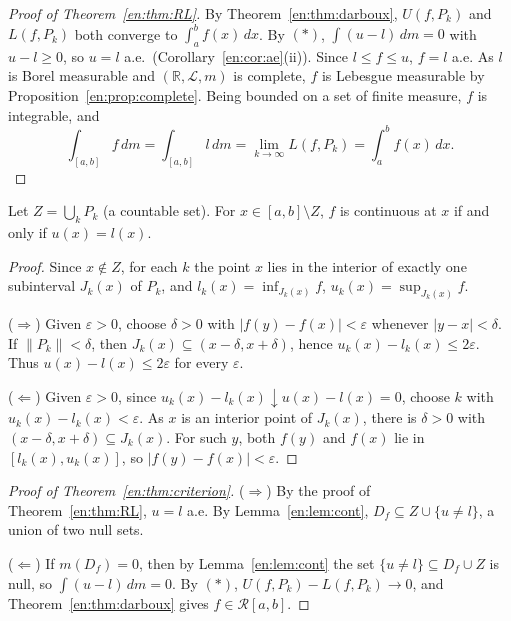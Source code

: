 \documentclass[11pt]{article}
\makeatletter
\newcommand{\envlabel}[1]{\protected@edef\@currentlabel{\themathenv}\label{#1}}
\makeatother
\begin{document}
\begin{proof}[Proof of Theorem~\ref{en:thm:RL}]
By Theorem~\ref{en:thm:darboux}, $U(f,P_{k})$ and $L(f,P_{k})$ both converge to $\int_{a}^{b}f(x)\,dx$. By $(\ast)$, $\int(u-l)\,dm=0$ with $u-l\geq0$, so $u=l$ a.e.\ (Corollary~\ref{en:cor:ae}(ii)). Since $l\leq f\leq u$, $f=l$ a.e. As $l$ is Borel measurable and $(\mathbb{R},\mathcal{L},m)$ is complete, $f$ is Lebesgue measurable by Proposition~\ref{en:prop:complete}. Being bounded on a set of finite measure, $f$ is integrable, and
\[
\int_{[a,b]}f\,dm=\int_{[a,b]}l\,dm=\lim_{k\to\infty}L(f,P_{k})=\int_{a}^{b}f(x)\,dx.
\]
\end{proof}

\begin{lemma}\envlabel{en:lem:cont}
Let $Z=\bigcup_{k}P_{k}$ (a countable set). For $x\in[a,b]\setminus Z$, $f$ is continuous at $x$ if and only if $u(x)=l(x)$.
\end{lemma}

\begin{proof}
Since $x\notin Z$, for each $k$ the point $x$ lies in the interior of exactly one subinterval $J_{k}(x)$ of $P_{k}$, and $l_{k}(x)=\inf_{J_{k}(x)}f$, $u_{k}(x)=\sup_{J_{k}(x)}f$.

($\Rightarrow$) Given $\varepsilon>0$, choose $\delta>0$ with $|f(y)-f(x)|<\varepsilon$ whenever $|y-x|<\delta$. If $\|P_{k}\|<\delta$, then $J_{k}(x)\subseteq(x-\delta,x+\delta)$, hence $u_{k}(x)-l_{k}(x)\leq2\varepsilon$. Thus $u(x)-l(x)\leq2\varepsilon$ for every $\varepsilon$.

($\Leftarrow$) Given $\varepsilon>0$, since $u_{k}(x)-l_{k}(x)\downarrow u(x)-l(x)=0$, choose $k$ with $u_{k}(x)-l_{k}(x)<\varepsilon$. As $x$ is an interior point of $J_{k}(x)$, there is $\delta>0$ with $(x-\delta,x+\delta)\subseteq J_{k}(x)$. For such $y$, both $f(y)$ and $f(x)$ lie in $[l_{k}(x),u_{k}(x)]$, so $|f(y)-f(x)|<\varepsilon$.
\end{proof}

\begin{proof}[Proof of Theorem~\ref{en:thm:criterion}]
($\Rightarrow$) By the proof of Theorem~\ref{en:thm:RL}, $u=l$ a.e. By Lemma~\ref{en:lem:cont}, $D_{f}\subseteq Z\cup\{u\neq l\}$, a union of two null sets.

($\Leftarrow$) If $m(D_{f})=0$, then by Lemma~\ref{en:lem:cont} the set $\{u\neq l\}\subseteq D_{f}\cup Z$ is null, so $\int(u-l)\,dm=0$. By $(\ast)$, $U(f,P_{k})-L(f,P_{k})\to0$, and Theorem~\ref{en:thm:darboux} gives $f\in\mathcal{R}[a,b]$.
\end{proof}
\end{document}
